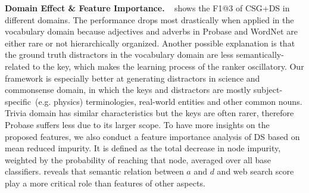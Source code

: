 



\noindent
\textbf{Domain Effect \& Feature Importance.} ~ shows the F1@3 of CSG+DS in different domains. The performance drops most drastically when applied in the vocabulary domain because adjectives and adverbs in Probase and WordNet are either rare or not hierarchically organized. Another possible explanation is that the ground truth distractors in the vocabulary domain are less semantically-related to the key, which makes the learning process of the ranker oscillatory.
Our framework is especially better at generating distractors in science and commonsense domain, in which the keys and distractors are mostly subject-specific~(e.g. physics) terminologies, real-world entities and other common nouns. Trivia domain has similar characteristics but the keys are often rarer, therefore Probase suffers less due to its larger scope.
To have more insights on the proposed features, we also conduct a feature importance analysis of DS based on mean reduced impurity. It is defined as the total decrease in node impurity, weighted by the probability of reaching that node, averaged over all base classifiers.  reveals that semantic relation between $a$ and $d$ and web search score play a more critical role than features of other aspects.
\label{sec:endtoend}

